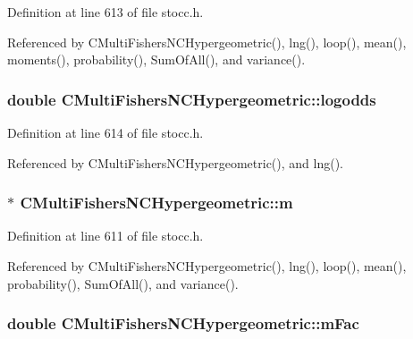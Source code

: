 Definition at line 613 of file stocc.\-h.



Referenced by C\-Multi\-Fishers\-N\-C\-Hypergeometric(), lng(), loop(), mean(), moments(), probability(), Sum\-Of\-All(), and variance().

\subsubsection[{logodds}]{\setlength{\rightskip}{0pt plus 5cm}double C\-Multi\-Fishers\-N\-C\-Hypergeometric\-::logodds\hspace{0.3cm}{\ttfamily [protected]}}\label{class_c_multi_fishers_n_c_hypergeometric_ad3c94616ebbb8901fa33333ecc5a569c}


Definition at line 614 of file stocc.\-h.



Referenced by C\-Multi\-Fishers\-N\-C\-Hypergeometric(), and lng().

\subsubsection[{m}]{ $\ast$ C\-Multi\-Fishers\-N\-C\-Hypergeometric\-::m\hspace{0.3cm}{\ttfamily [protected]}}\label{class_c_multi_fishers_n_c_hypergeometric_ab7f3ba1b59097caf8c04c5ec5cbfbe84}


Definition at line 611 of file stocc.\-h.



Referenced by C\-Multi\-Fishers\-N\-C\-Hypergeometric(), lng(), loop(), mean(), probability(), Sum\-Of\-All(), and variance().

\subsubsection[{m\-Fac}]{\setlength{\rightskip}{0pt plus 5cm}double C\-Multi\-Fishers\-N\-C\-Hypergeometric\-::m\-Fac\hspace{0.3cm}{\ttfamily [protected]}}\label{class_c_multi_fishers_n_c_hypergeometric_a4b03b92680e8a61f59621e7dede2619c}


